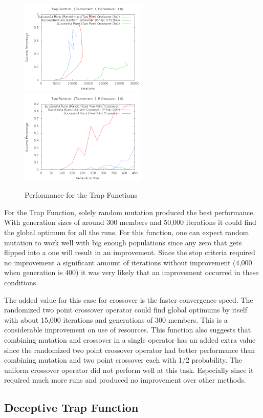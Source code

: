 \documentclass[10pt]{article}
\begin{document}
\begin{figure}[h!]
    \includegraphics[height=170px]{img/TrapFunctionCrossoverIters.png}
    \includegraphics[height=170px]{img/TrapFunctionCrossoverGens.png}
    \caption[Performance for the Trap Functions]{Performance for the Trap Functions}
\end{figure}

For the Trap Function, solely random mutation produced the best performance. With generation sizes of around 300 members and 50,000 iterations it could find the global optimum for all the runs. For this function, one can expect random mutation to work well with big enough populations since any zero that gets flipped into a one will result in an improvement. Since the stop criteria required no improvement a significant amount of iterations without improvement (4,000 when generation is 400) it was very likely that an improvement occurred in these conditions.

The added value for this case for crossover is the faster convergence speed. The randomized two point crossover operator could find global optimums by itself with about 15,000 iterations and generations of 300 members. This is a considerable improvement on use of resources. This function also suggests that combining mutation and crossover in a single operator has an added extra value since the randomized two point crossover operator had better performance than combining mutation and two point crossover each with 1/2 probability. The uniform crossover operator did not perform well at this task. Especially since it required much more runs and produced no improvement over other methods.
\pagebreak
\subsection{Deceptive Trap Function}
\end{document}
